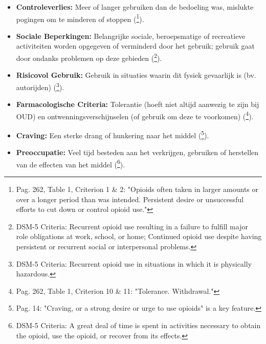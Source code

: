 \documentclass[11pt, a4paper]{report} %
\begin{document}
\begin{itemize}
    \item \textbf{Controleverlies:} Meer of langer gebruiken dan de bedoeling was, mislukte pogingen om te minderen of stoppen (\cite{Cicero2017Review}\footnote{Pag. 262, Table 1, Criterion 1 & 2: "Opioids often taken in larger amounts or over a longer period than was intended. Persistent desire or unsuccessful efforts to cut down or control opioid use."}).
    \item \textbf{Sociale Beperkingen:} Belangrijke sociale, beroepsmatige of recreatieve activiteiten worden opgegeven of verminderd door het gebruik; gebruik gaat door ondanks problemen op deze gebieden (\cite{AmericanPsychiatricAssociationDSM5}\footnote{DSM-5 Criteria: Recurrent opioid use resulting in a failure to fulfill major role obligations at work, school, or home; Continued opioid use despite having persistent or recurrent social or interpersonal problems.}).
    \item \textbf{Risicovol Gebruik:} Gebruik in situaties waarin dit fysiek gevaarlijk is (bv. autorijden) (\cite{AmericanPsychiatricAssociationDSM5}\footnote{DSM-5 Criteria: Recurrent opioid use in situations in which it is physically hazardous.}).
    \item \textbf{Farmacologische Criteria:} Tolerantie (hoeft niet altijd aanwezig te zijn bij OUD) en ontwenningsverschijnselen (of gebruik om deze te voorkomen) (\cite{Cicero2017Review}\footnote{Pag. 262, Table 1, Criterion 10 & 11: "Tolerance. Withdrawal."}).
    \item \textbf{Craving:} Een sterke drang of hunkering naar het middel (\cite{Kosten2002NeurobiologyDependence}\footnote{Pag. 14: "Craving, or a strong desire or urge to use opioids" is a key feature.}).
    \item \textbf{Preoccupatie:} Veel tijd besteden aan het verkrijgen, gebruiken of herstellen van de effecten van het middel (\cite{AmericanPsychiatricAssociationDSM5}\footnote{DSM-5 Criteria: A great deal of time is spent in activities necessary to obtain the opioid, use the opioid, or recover from its effects.}).
\end{itemize}
\end{document}

